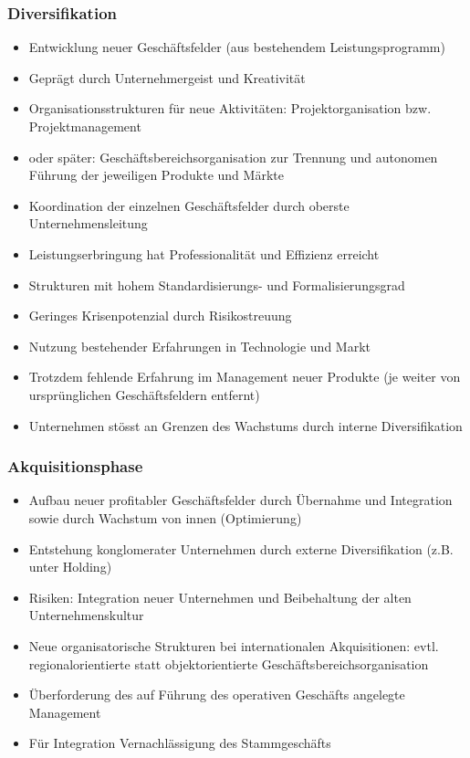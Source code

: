 \subsubsection{Diversifikation}
\begin{itemize}
	\item Entwicklung neuer Geschäftsfelder (aus bestehendem Leistungsprogramm)
	\item Geprägt durch Unternehmergeist und Kreativität
	\item Organisationsstrukturen für neue Aktivitäten: Projektorganisation bzw. Projektmanagement
	\item oder später: Geschäftsbereichsorganisation zur Trennung und autonomen Führung der jeweiligen Produkte und Märkte
	\item Koordination der einzelnen Geschäftsfelder durch oberste Unternehmensleitung
	\item Leistungserbringung hat Professionalität und Effizienz erreicht
	\item Strukturen mit hohem Standardisierungs- und Formalisierungsgrad
	\item Geringes Krisenpotenzial durch Risikostreuung
	\item Nutzung bestehender Erfahrungen in Technologie und Markt
	\item Trotzdem fehlende Erfahrung im Management neuer Produkte (je weiter von ursprünglichen Geschäftsfeldern entfernt)
	\item Unternehmen stösst an Grenzen des Wachstums durch interne Diversifikation
\end{itemize}

\subsubsection{Akquisitionsphase}
\begin{itemize}
	\item Aufbau neuer profitabler Geschäftsfelder durch Übernahme und Integration sowie durch Wachstum von innen (Optimierung)
	\item Entstehung konglomerater Unternehmen durch externe Diversifikation (z.B. unter Holding)
	\item Risiken: Integration neuer Unternehmen und Beibehaltung der alten	Unternehmenskultur
	\item Neue organisatorische Strukturen bei internationalen Akquisitionen: evtl. regionalorientierte statt objektorientierte Geschäftsbereichsorganisation
	\item Überforderung des auf Führung des operativen Geschäfts angelegte Management
	\item Für Integration Vernachlässigung des Stammgeschäfts
\end{itemize}

